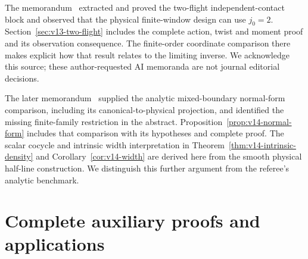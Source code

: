 The memorandum~\cite{A2ReviewV12} extracted and proved the two-flight
independent-contact block and observed that the physical finite-window
design can use $j_0=2$. Section~\ref{sec:v13-two-flight} includes the
complete action, twist and moment proof and its observation consequence.
The finite-order coordinate comparison there makes explicit how that
result relates to the limiting inverse. We acknowledge this source;
these author-requested AI memoranda are not journal editorial decisions.

The later memorandum~\cite{A2ReviewV13NF} supplied the analytic
mixed-boundary normal-form comparison, including its canonical-to-physical
projection, and identified the missing finite-family restriction in the
abstract. Proposition~\ref{prop:v14-normal-form} includes that comparison
with its hypotheses and complete proof. The scalar cocycle and intrinsic
width interpretation in Theorem~\ref{thm:v14-intrinsic-density} and
Corollary~\ref{cor:v14-width} are derived here from the smooth physical
half-line construction. We distinguish this further argument from the
referee's analytic benchmark.

\appendix
\renewcommand{\thesection}{A.\arabic{section}}
\renewcommand{\theHsection}{appendix.\arabic{section}}
\part{Complete auxiliary proofs and applications}





































